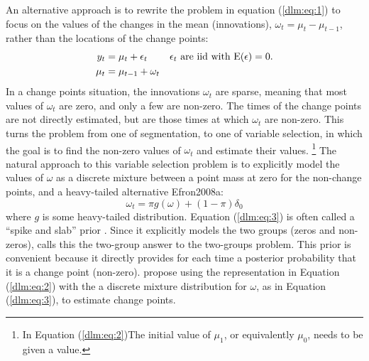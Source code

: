 An alternative approach is to rewrite the problem in equation (\ref{dlm:eq:1}) to focus on the values of the changes in the mean (innovations), $\omega_{t} = \mu_{t} - \mu_{t - 1}$, rather than the locations of the change points:
\begin{equation}
  \label{dlm:eq:2}
  \begin{aligned}[t]
    y_{t} &= \mu_{t} + \epsilon_{t} && \text{$\epsilon_{t}$ are iid with $\operatorname{E}(\epsilon) = 0$.} \\
    \mu_{t} &= \mu_{t - 1} + \omega_{t}
  \end{aligned}
\end{equation}
In a change points situation, the innovations $\omega_{t}$ are sparse, meaning that most values of $\omega_{t}$ are zero, and only a few are non-zero.
The times of the change points are not directly estimated, but are those times at which $\omega_{t}$ are non-zero.
This turns the problem from one of segmentation, to one of variable selection, in which the goal is to find the non-zero values of $\omega_{t}$ and estimate their values.
\footnote{In Equation (\ref{dlm:eq:2})The initial value of $\mu_{1}$, or equivalently $\mu_{0}$, needs to be given a value.
}
The natural approach to this variable selection problem is to explicitly model the values of $\omega$ as a discrete mixture between a point mass at zero for the non-change points, and a heavy-tailed alternative \textcite{MitchellBeauchamp1988a}{Efron2008a}:
\begin{equation}
  \label{dlm:eq:3}
  \omega_{t} = \pi g(\omega) + (1 - \pi) \delta_{0}
\end{equation}
where $g$ is some heavy-tailed distribution.
Equation (\ref{dlm:eq:3}) is often called a ``spike and slab'' prior \textcite{MitchellBeauchamp1988a}.
Since it explicitly models the two groups (zeros and non-zeros), \textcite{Efron2008a} calls this the two-group answer to the two-groups problem.
This prior is convenient because it directly provides for each time a posterior probability that it is a change point (non-zero).
\textcite{GiordaniKohn2008} propose using the representation in Equation (\ref{dlm:eq:2}) with the a discrete mixture distribution for $\omega$, as in Equation (\ref{dlm:eq:3}), to estimate change points.

